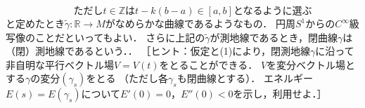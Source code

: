 \documentclass[uplatex,dvipdfmx,fontsize=12pt,jafontsize=11pt,line_length=42zw,number_of_lines=36,hanging_punctuation]{jlreq}
\begin{document}
\begin{enumerate-problems}
\begin{enumerate-subproblems}
{\begin{equation}
					\qquad\text{ただし$t\in\mathbb{Z}$は$t-k(b-a)\in[a,b]$となるように選ぶ}
				\end{equation}
				と定めたとき$\tilde{\gamma}\colon\mathbb{R}\to M$がなめらかな曲線であるようなもの．
				円周$S^1$からの$C^\infty$級写像のことだといってもよい．
				さらに上記の$\tilde{\gamma}$が測地線であるとき，閉曲線$\gamma$は（閉）測地線であるという．}．
				［ヒント：仮定と(1)により，閉測地線$\gamma$に沿って非自明な平行ベクトル場$V=V(t)$をとることができる．
				$V$を変分ベクトル場とする$\gamma$の変分$(\gamma_s)$をとる
				（ただし各$\gamma_s$も閉曲線とする）．
				エネルギー$E(s)=E(\gamma_s)$について$E'(0)=0$，$E''(0)<0$を示し，利用せよ．］
		\end{enumerate-subproblems}
\end{enumerate-problems}
\end{document}
